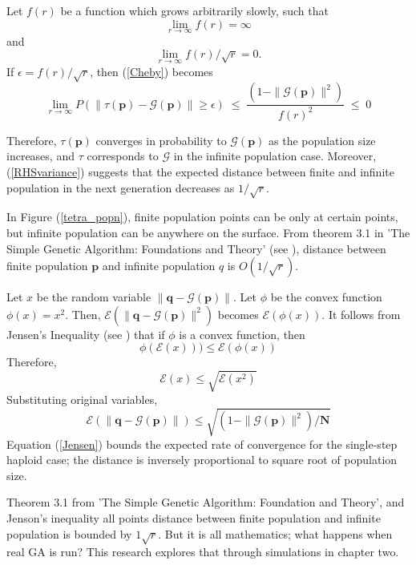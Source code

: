 Let $f(r)$ be a function which grows arbitrarily slowly, such that 
\[
\lim_{r \to \infty} f(r)  =  \infty
\]
and
\[
\lim_{r \to \infty} f(r)/\sqrt{r}  =  0.
\]
If $\epsilon  =  f(r)/\sqrt{r}$, then (\ref{Cheby}) becomes
\begin{equation*}
\lim_{r \to \infty} P(\| \tau (\bm{p}) - \mathcal{G}(\bm{p}) \| \geq \epsilon) \; \leq \; \frac{(1 - \|\mathcal{G}(\bm{p})\|^2)} {{f(r)}^2} \; \leq \; 0
\end{equation*}

Therefore, $\tau(\bm{p})$ converges in probability to $\mathcal{G}(\bm{p})$ as the population size increases, 
and $\tau$ corresponds to $\mathcal{G}$ 
in the infinite population case. Moreover, (\ref{RHSvariance}) suggests that the expected distance between finite and 
infinite population in the next generation decreases as $1/\sqrt{r}$.

In Figure (\ref{tetra_popn}), finite population points can be only at certain points, but infinite population can be anywhere on the surface. 
From theorem 3.1 in 'The Simple Genetic Algorithm: Foundations and Theory' (see \cite{Vose1999}), distance between finite population $\bm{p}$ 
and infinite population $q$ is $O(1/\sqrt{r})$. 

Let $x$ be the random variable $\| \bm{q} - \mathcal{G}(\bm{p}) \|$. Let $\phi$ be the convex function $\phi (x) = x^2$. 
Then, $\mathcal{E}(\| \bm{q} - \mathcal{G}(\bm{p}) \|^2)$ becomes $\mathcal{E}(\phi (x))$. 
It follows from Jensen's Inequality (see \cite{JensenInequality}) that 
if $\phi$ is a convex function, then
\[
\phi(\mathcal{E}(x))) \leq \mathcal{E}(\phi(x)) 
\]
Therefore,
\[
\mathcal{E}(x) \leq \sqrt{\mathcal{E}(x^2)}
\]
Substituting original variables,
\begin{equation}
\label{Jensen}
\mathcal{E}(\| \bm{q} - \mathcal{G}(\bm{p}) \|) \leq \sqrt{(1 - \|\mathcal{G}(\bm{p})\|^2) / \bm{N}}
\end{equation}
Equation (\ref{Jensen}) bounds the expected rate of convergence for the single-step haploid case; 
the distance is inversely proportional to square root of population size.

Theorem 3.1 from 'The Simple Genetic Algorithm: Foundation and Theory', 
and Jenson's inequality all points distance between finite population and infinite population is bounded 
by $1\sqrt{r}$. But it is all mathematics; what happens when real GA is run? This research explores that 
through simulations in chapter two.

